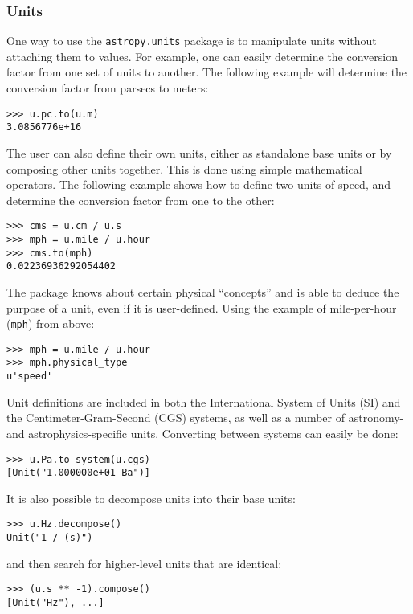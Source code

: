 \documentclass[traditabstract]{aa}
\begin{document}
\subsubsection{Units}

\label{sec:units}

One way to use the \texttt{astropy.units} package is to manipulate units
without attaching them to values. For example, one can easily determine the
conversion factor from one set of units to another. The following example will
determine the conversion factor from parsecs to meters:
\begin{verbatim}
>>> u.pc.to(u.m)
3.0856776e+16
\end{verbatim}
The user can also define their own units, either as standalone base
units or by composing other units together.  This is done using simple
mathematical operators. The following example shows how to define two units of
speed, and determine the conversion factor from one to the other:
\begin{verbatim}
>>> cms = u.cm / u.s
>>> mph = u.mile / u.hour
>>> cms.to(mph)
0.02236936292054402
\end{verbatim}

The package knows about certain physical ``concepts'' and is able to
deduce the purpose of a unit, even if it is user-defined.  Using the
example of mile-per-hour (\texttt{mph}) from above:
\begin{verbatim}
>>> mph = u.mile / u.hour
>>> mph.physical_type
u'speed'
\end{verbatim}

Unit definitions are included in both the
International System of Units (SI) and the Centimeter-Gram-Second
(CGS) systems, as well as a number of astronomy- and
astrophysics-specific units.  Converting between systems can easily be done:
\begin{verbatim}
>>> u.Pa.to_system(u.cgs)
[Unit("1.000000e+01 Ba")]
\end{verbatim}
It is also possible to decompose units into their base units:
\begin{verbatim}
>>> u.Hz.decompose()
Unit("1 / (s)")
\end{verbatim}
and then search for higher-level units that are identical:
\begin{verbatim}
>>> (u.s ** -1).compose()
[Unit("Hz"), ...]
\end{verbatim}
\end{document}
